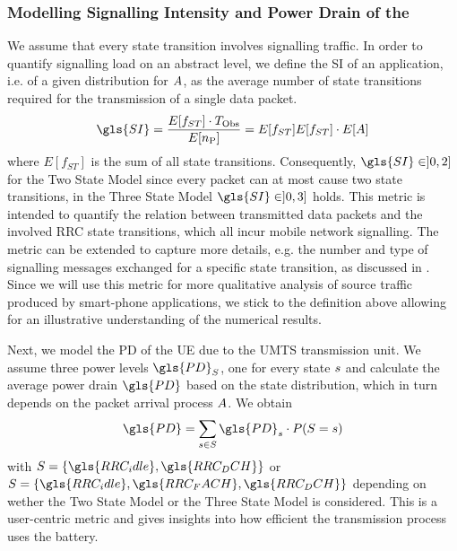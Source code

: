 \subsubsection*{Modelling Signalling Intensity and Power Drain of the }\label{sec:network:performance_model:analytical_model:metrics}

\newcommand{\fStateTransitions}{E[f_{ST}]}

We assume that every state transition involves signalling traffic.
In order to quantify signalling load on an abstract level, we define the \gls{SI} of an application, i.e. of a given distribution for \(A\), as the average number of state transitions required for the transmission of a single data packet.
\begin{equation}
\gls{SI} = \frac{\fStateTransitions \cdot \ObservationInterval}{E[\NObservedPackets]}\\
= \fStateTransitions {E[f_{ST}] }\cdot E[\PacketIAT]
\label{eq::sigIntensity}
\end{equation}
where \(\fStateTransitions\) is the sum of all state transitions.
Consequently, \(\gls{SI} \in ]0,2]\) for the Two State Model since every packet can at most cause two state transitions, in the Three State Model \(\gls{SI} \in]0,3]\) holds.
This metric is intended to quantify the relation between transmitted data packets and the involved \gls{RRC} state transitions, which all incur mobile network signalling.
The metric can be extended to capture more details, e.g. the number and type of signalling messages exchanged for a specific state transition, as discussed in .
Since we will use this metric for more qualitative analysis of source traffic produced by smart-phone applications, we stick to the definition above allowing for an illustrative understanding of the numerical results.

Next, we model the \gls{PD} of the \gls{UE} due to the \gls{UMTS} transmission unit. 
We assume three power levels \(\gls{PD}_{\RRCState}\), one for every state \(s\) and calculate the average power drain \(\gls{PD}\) based on the state distribution, which in turn depends on the packet arrival process \(A\).
We obtain
\begin{equation}
\gls{PD} = \sum_{\RRCStateRealization\in\RRCState} \gls{PD}_{\RRCStateRealization} \cdot P(\RRCState=\RRCStateRealization)
\label{eq::powerdrain}
\end{equation}
with \(\RRCState = \{\gls{RRC_idle},\gls{RRC_DCH}\}\) or \(\RRCState = \{\gls{RRC_idle},\gls{RRC_FACH},\gls{RRC_DCH}\}\) depending on wether the Two State Model or the Three State Model is considered.
This is a user-centric metric and gives insights into how efficient the transmission process uses the battery. 